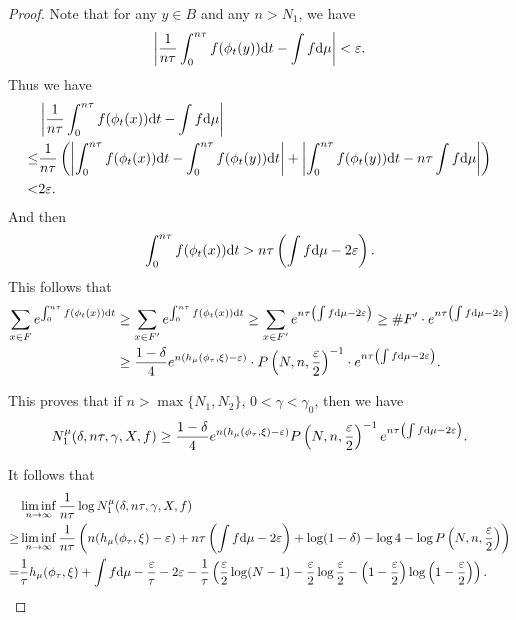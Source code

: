 \documentclass[10pt]{article}
\newtheorem*{Theorem A}{Theorem A}
\begin{document}
\begin{proof}
Note that for any \( y \in B \) and any \( n > N_1 \), we have
\[
\left| \frac{1}{n\tau} \int_0^{n\tau} f(\phi_t(y)) {\rm d}t - \int f {\rm d}\mu \right| < \varepsilon.
\]
Thus we have
\[
\begin{aligned}
&\left| \frac{1}{n\tau} \int_0^{n\tau} f(\phi_t(x)) {\rm d}t - \int f {\rm d}\mu \right| \\
\leq& \frac{1}{n\tau} \left( \left| \int_0^{n\tau} f(\phi_t(x)) {\rm d}t - \int_0^{n\tau} f(\phi_t(y)) {\rm d}t \right| + \left| \int_0^{n\tau} f(\phi_t(y)) {\rm d}t-  n\tau\int f {\rm d}\mu \right| \right)\\
<& 2\varepsilon.
\end{aligned}
\]
And then
\[
\int_0^{n\tau} f(\phi_t(x)) {\rm d}t> n\tau \left( \int f {\rm d}\mu - 2\varepsilon \right).
\]
This follows that
\[
\begin{aligned}
\sum_{x \in F} e^{\int_0^{n\tau} f(\phi_t(x)) {\rm d}t} &\geq \sum_{x \in F'} e^{\int_0^{n\tau} f(\phi_t(x)) {\rm d}t} \geq \sum_{x \in F'} e^{n\tau \left( \int f {\rm d}\mu - 2\varepsilon \right)} \geq \# F' \cdot e^{n\tau \left( \int f {\rm d}\mu - 2\varepsilon \right)} \\
&\geq \frac{1 - \delta}{4} e^{n(h_\mu(\phi_\tau, \xi) - \varepsilon)} \cdot P\left( N, n, \frac{\varepsilon}{2} \right)^{-1} \cdot e^{n\tau \left( \int f {\rm d}\mu - 2\varepsilon \right)}.
\end{aligned}
\]

This proves that if \( n > \max\{N_1, N_2\}, \,0<\gamma<\gamma_0 \), then we have
\[
N_1^\mu(\delta, n\tau, \gamma, X, f) \geq \frac{1 - \delta}{4} e^{n(h_\mu(\phi_\tau, \xi) - \varepsilon)} P\left( N, n, \frac{\varepsilon}{2} \right)^{-1} e^{n\tau \left( \int f {\rm d}\mu - 2\varepsilon \right)}.
\]

\noindent
It follows that
\[
\begin{aligned}
&\liminf_{n \to \infty} \frac{1}{n\tau} \log N_1^\mu(\delta, n\tau, \gamma, X, f) \\
\geq& \liminf_{n \to \infty} \frac{1}{n\tau} \left( n(h_\mu(\phi_\tau, \xi) - \varepsilon) + n\tau \left( \int f {\rm d}\mu -2\varepsilon \right)+\log(1 - \delta) - \log 4 - \log P\left( N, n, \frac{\varepsilon}{2} \right) \right) \\
=& \frac{1}{\tau} h_\mu(\phi_\tau, \xi) + \int f {\rm d}\mu - \frac{\varepsilon}{\tau} - 2\varepsilon -\frac{1}{\tau} \left(\frac{\varepsilon}{2} \log(N - 1) - \frac{\varepsilon}{2} \log \frac{\varepsilon}{2} - \left( 1 - \frac{\varepsilon}{2} \right) \log \left( 1 - \frac{\varepsilon}{2} \right)\right).
\end{aligned}
\]


\end{proof}
\end{document}
